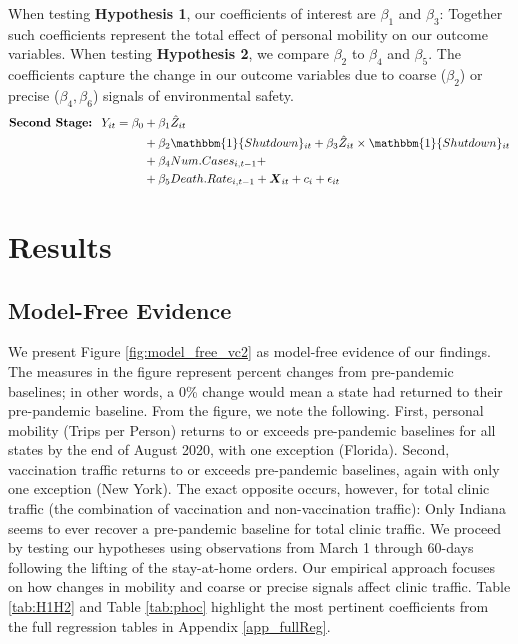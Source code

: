  When testing \textbf{Hypothesis 1}, our coefficients of interest are $\beta_1$ and $\beta_3$: Together such coefficients represent the total effect of personal mobility on our outcome variables. When testing \textbf{Hypothesis 2}, we compare $\beta_2$ to $\beta_4$ and $\beta_5$. The coefficients capture the change in our outcome variables due to coarse ($\beta_2$) or precise ($\beta_4,\beta_6$) signals of environmental safety. 
 \begin{equation} \begin{split} \label{spec_2sls}
     \textbf{Second Stage: \:}  Y_{it} = \beta_0 & + \beta_1 \hat{Z}_{it} \\ & + \beta_2 \mathbbm{1}\{Shutdown\}_{it} + \beta_3 \hat{Z}_{it} \times \mathbbm{1}\{Shutdown\}_{it} \\ & + \beta_4 Num.Cases_{i,t-1} + \\ & + \beta_5 Death.Rate_{i,t-1} + \boldsymbol{X}_{it} + c_i + \epsilon_{it} 
 \end{split} \end{equation}
 
 
\section{Results} \label{VC2_Results}
 \subsection{Model-Free Evidence}
 We present Figure \ref{fig:model_free_vc2} as model-free evidence of our findings. The measures in the figure represent percent changes from pre-pandemic baselines; in other words, a 0\% change would mean a state had returned to their pre-pandemic baseline. From the figure, we note the following. First, personal mobility (Trips per Person) returns to or exceeds pre-pandemic baselines for all states by the end of August 2020, with one exception (Florida). Second, vaccination traffic returns to or exceeds pre-pandemic baselines, again with only one exception (New York). The exact opposite occurs, however, for total clinic traffic (the combination of vaccination and non-vaccination traffic): Only Indiana seems to ever recover a pre-pandemic baseline for total clinic traffic. We proceed by testing our hypotheses using observations from March 1 through 60-days following the lifting of the stay-at-home orders. Our empirical approach focuses on how changes in mobility and coarse or precise signals affect clinic traffic. Table \ref{tab:H1H2} and Table \ref{tab:phoc} highlight the most pertinent coefficients from the full regression tables in Appendix \ref{app_fullReg}.
 
